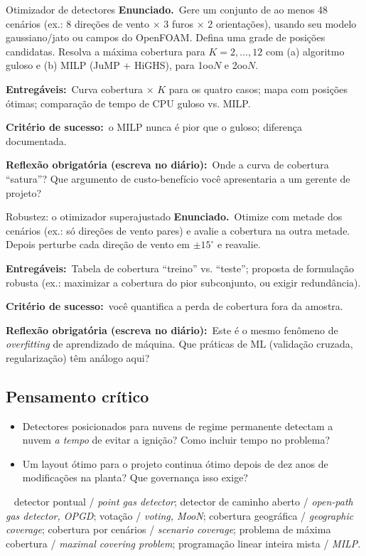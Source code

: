 \documentclass[10pt,a4paper,twocolumn,openany]{report}
\newcommand{\lead}[2]{\par\medskip\noindent{\color{#1}\bfseries #2}\ }
\newenvironment{critico}{\subsection*{\textcolor{roxo}{Pensamento crítico}}}{\par}
\newenvironment{chaves}{\lead{cinza}{Palavras-chave (PT/EN):}\small}{\par}
\newcommand{\enunciado}{\noindent\textbf{Enunciado.}\ }
\newcommand{\entregaveis}{\par\medskip\noindent\textbf{Entregáveis:}}
\newcommand{\criterio}{\par\medskip\noindent\textbf{Critério de sucesso:}\ }
\newcommand{\reflexao}{\par\medskip\noindent\textbf{Reflexão obrigatória (escreva no diário):}}
\begin{document}
\begin{tarefa}{Otimizador de detectores}
\enunciado Gere um conjunto de ao menos 48 cenários (ex.: 8 direções de
vento $\times$ 3 furos $\times$ 2 orientações), usando seu modelo
gaussiano/jato ou campos do OpenFOAM. Defina uma grade de posições candidatas.
Resolva a máxima cobertura para $K=2,\ldots,12$ com (a) algoritmo guloso e
(b) MILP (JuMP + HiGHS), para 1oo$N$ e 2oo$N$.
\entregaveis\ Curva cobertura $\times$ $K$ para os quatro casos; mapa com
posições ótimas; comparação de tempo de CPU guloso vs. MILP.
\criterio o MILP nunca é pior que o guloso; diferença documentada.
\reflexao\ Onde a curva de cobertura ``satura''? Que argumento de custo-benefício
você apresentaria a um gerente de projeto?
\end{tarefa}

\begin{tarefa}{Robustez: o otimizador superajustado}
\enunciado Otimize com metade dos cenários (ex.: só direções de vento
pares) e avalie a cobertura na outra metade. Depois perturbe cada direção
de vento em $\pm15^\circ$ e reavalie.
\entregaveis\ Tabela de cobertura ``treino'' vs. ``teste''; proposta de
formulação robusta (ex.: maximizar a cobertura do pior subconjunto, ou
exigir redundância).
\criterio você quantifica a perda de cobertura fora da amostra.
\reflexao\ Este é o mesmo fenômeno de \emph{overfitting} de aprendizado de
máquina. Que práticas de ML (validação cruzada, regularização) têm análogo
aqui?
\end{tarefa}

\begin{critico}
\begin{itemize}
  \item Detectores posicionados para nuvens de regime permanente detectam
        a nuvem \emph{a tempo} de evitar a ignição? Como incluir tempo no
        problema?
  \item Um layout ótimo para o projeto continua ótimo depois de dez anos de
        modificações na planta? Que governança isso exige?
\end{itemize}
\end{critico}

\begin{chaves}
detector pontual / \emph{point gas detector}; detector de caminho aberto /
\emph{open-path gas detector, OPGD}; votação / \emph{voting, MooN};
cobertura geográfica / \emph{geographic coverage}; cobertura por cenários /
\emph{scenario coverage}; problema de máxima cobertura / \emph{maximal
covering problem}; programação linear inteira mista / \emph{MILP}.
\end{chaves}
\end{document}
